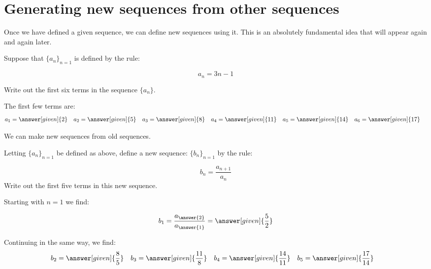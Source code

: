 \documentclass{ximera}
\begin{document}
\section{Generating new sequences from other sequences}

Once we have defined a given sequence, we can define new sequences using it.  This is an absolutely fundamental idea that will appear again and again later.

\begin{example}
Suppose that $\{a_n\}_{n=1}$ is defined by the rule:

\[
a_n = 3n-1
\]

Write out the first six terms in the sequence $\{a_n\}$.
\begin{explanation}
  The first few terms are:
    \begin{align*}
      a_1 &= \answer[given]{2} & 
      a_2 &= \answer[given]{5} & 
      a_3 &= \answer[given]{8} & 
      a_4 &= \answer[given]{11} & 
      a_5 &= \answer[given]{14}  & 
      a_6 &= \answer[given]{17} 
    \end{align*}
\end{explanation}
\end{example}

We can make new sequences from old sequences.

\begin{example}
Letting $\{a_n\}_{n=1}$ be defined as above, define a new sequence:
$\{b_n\}_{n=1}$ by the rule:

\[
b_n = \frac{a_{n+1}}{a_n} 
\]
Write out the first five terms in this new sequence.

\begin{explanation}
Starting with $n=1$ we find:

\[      b_1 = \frac{a_{\answer{2}}}{a_{\answer{1}}} = \answer[given]{\frac{5}{2}}       \]
      
Continuing in the same way, we find:     
     \begin{align*}
      	b_2 &=  \answer[given]{\frac{8}{5}}  & 
	b_3 &= \answer[given]{\frac{11}{8}}  & 
	b_4 &= \answer[given]{\frac{14}{11}}  & 
	b_5 &=  \answer[given]{\frac{17}{14}}  & 
    \end{align*}
    
\end{explanation}
    
\end{example}
\end{document}
